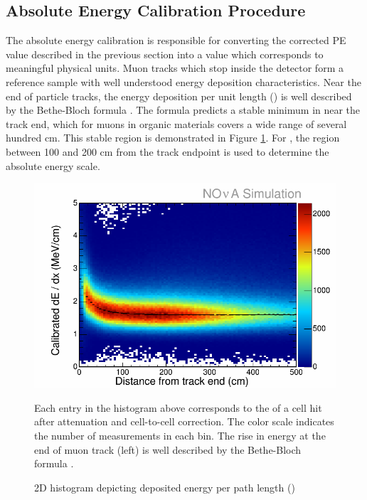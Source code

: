 \subsection{Absolute Energy Calibration Procedure}

The absolute energy calibration is responsible for converting the corrected
PE value described in the previous section into a value which corresponds
to meaningful physical units.
Muon tracks which stop inside the detector form a reference sample with well
understood energy deposition characteristics.
Near the end of particle tracks, the energy deposition per unit length
(\dedx) is well described by the Bethe-Bloch formula \cite{pdg}.
The formula predicts a stable minimum in \dedx near the track end,
which for muons in organic materials covers a wide range of several hundred cm.
This stable region is demonstrated in Figure \ref{calib_dEdX}.
For \nova, the region between 100 and 200 cm from the track endpoint is used
to determine the absolute energy scale.

\begin{figure}[t]
\begin{center}
\includegraphics[width=\textwidth]{figures/plots/reco/calib_dEdX.png}
\end{center}
\caption{2D histogram depicting deposited energy per path length (\dedx)}{
Each entry in the histogram above corresponds to the \dedx of a
cell hit after attenuation and cell-to-cell correction.  The color scale
indicates the number of measurements in each bin.  The rise in energy at the
end of muon track (left) is well described by the Bethe-Bloch formula \cite{pdg}.}
\label{calib_dEdX}
\end{figure}

